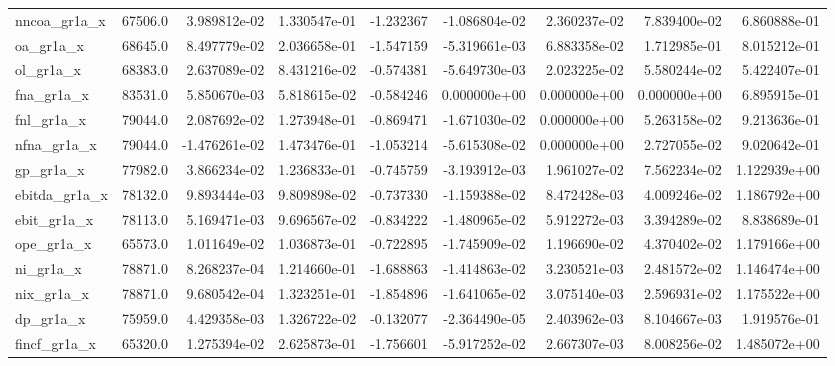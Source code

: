 \documentclass[10pt]{article}
\begin{document}
\begin{landscape}
\begin{longtable}{lrrrrrrrr}
nncoa\_gr1a\_x            &   67506.0 &  3.989812e-02 &  1.330547e-01 &     -1.232367 & -1.086804e-02 &  2.360237e-02 &  7.839400e-02 &  6.860888e-01 \\
oa\_gr1a\_x               &   68645.0 &  8.497779e-02 &  2.036658e-01 &     -1.547159 & -5.319661e-03 &  6.883358e-02 &  1.712985e-01 &  8.015212e-01 \\
ol\_gr1a\_x               &   68383.0 &  2.637089e-02 &  8.431216e-02 &     -0.574381 & -5.649730e-03 &  2.023225e-02 &  5.580244e-02 &  5.422407e-01 \\
fna\_gr1a\_x              &   83531.0 &  5.850670e-03 &  5.818615e-02 &     -0.584246 &  0.000000e+00 &  0.000000e+00 &  0.000000e+00 &  6.895915e-01 \\
fnl\_gr1a\_x              &   79044.0 &  2.087692e-02 &  1.273948e-01 &     -0.869471 & -1.671030e-02 &  0.000000e+00 &  5.263158e-02 &  9.213636e-01 \\
nfna\_gr1a\_x             &   79044.0 & -1.476261e-02 &  1.473476e-01 &     -1.053214 & -5.615308e-02 &  0.000000e+00 &  2.727055e-02 &  9.020642e-01 \\
gp\_gr1a\_x               &   77982.0 &  3.866234e-02 &  1.236833e-01 &     -0.745759 & -3.193912e-03 &  1.961027e-02 &  7.562234e-02 &  1.122939e+00 \\
ebitda\_gr1a\_x           &   78132.0 &  9.893444e-03 &  9.809898e-02 &     -0.737330 & -1.159388e-02 &  8.472428e-03 &  4.009246e-02 &  1.186792e+00 \\
ebit\_gr1a\_x             &   78113.0 &  5.169471e-03 &  9.696567e-02 &     -0.834222 & -1.480965e-02 &  5.912272e-03 &  3.394289e-02 &  8.838689e-01 \\
ope\_gr1a\_x              &   65573.0 &  1.011649e-02 &  1.036873e-01 &     -0.722895 & -1.745909e-02 &  1.196690e-02 &  4.370402e-02 &  1.179166e+00 \\
ni\_gr1a\_x               &   78871.0 &  8.268237e-04 &  1.214660e-01 &     -1.688863 & -1.414863e-02 &  3.230521e-03 &  2.481572e-02 &  1.146474e+00 \\
nix\_gr1a\_x              &   78871.0 &  9.680542e-04 &  1.323251e-01 &     -1.854896 & -1.641065e-02 &  3.075140e-03 &  2.596931e-02 &  1.175522e+00 \\
dp\_gr1a\_x               &   75959.0 &  4.429358e-03 &  1.326722e-02 &     -0.132077 & -2.364490e-05 &  2.403962e-03 &  8.104667e-03 &  1.919576e-01 \\
fincf\_gr1a\_x            &   65320.0 &  1.275394e-02 &  2.625873e-01 &     -1.756601 & -5.917252e-02 &  2.667307e-03 &  8.008256e-02 &  1.485072e+00 \\

\end{longtable}
\end{landscape}
\end{document}
